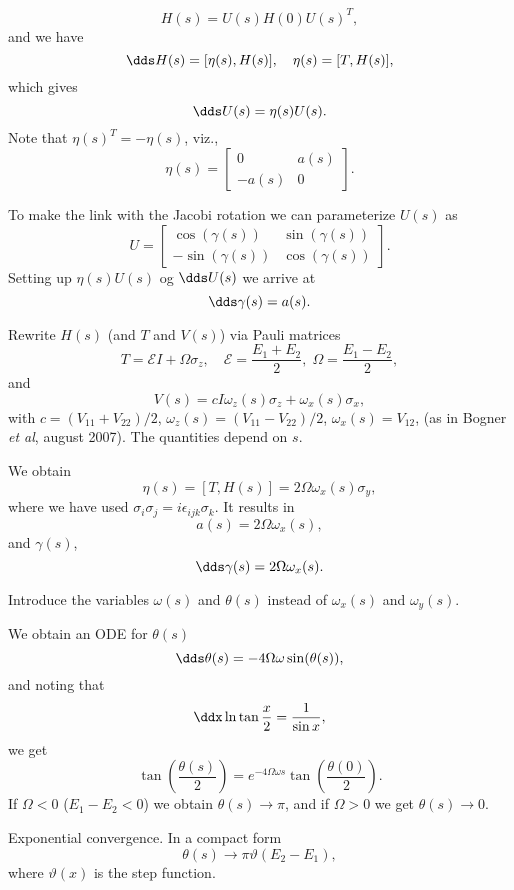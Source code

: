 \[ H(s) = U(s)H(0)U(s)^T, \]
and we have
\[ \dds H(s) = [\eta(s),H(s)],  \quad \eta(s) = [T,H(s)], \]
which gives
\[ \dds U(s) = \eta(s) U(s). \]
Note that $\eta(s)^T = -\eta(s)$, viz.,
\[ \eta(s) = \begin{bmatrix} 0 & a(s) \\ -a(s) & 0 \end{bmatrix}. \]

To make the link with the Jacobi rotation
we can parameterize $U(s)$ as
\[ U = \begin{bmatrix} \cos(\gamma(s)) & \sin(\gamma(s)) \\ -\sin(\gamma(s)) & \cos(\gamma(s)) \end{bmatrix}. \]
Setting up $\eta(s)U(s)$ og $\dds U(s)$ we arrive at 
\[ \dds \gamma(s) = a(s). \]

Rewrite $H(s)$ (and $T$ and $V(s)$)  via Pauli matrices
\[ T = \mathcal{E} I + \Omega \sigma_z, \quad \mathcal{E} = \frac{E_1
  + E_2}{2}, \; \Omega = \frac{E_1-E_2}{2}, \]
and
\[ V(s) = c I \omega_z(s)\sigma_z + \omega_x(s)\sigma_x, \]
with $c = (V_{11}+V_{22})/2$, $\omega_z(s) = (V_{11}-V_{22})/2$,
$\omega_x(s) = V_12$, (as in Bogner {\em et al}, august 2007). The quantities depend on
$s$. 

We obtain
\[ \eta(s) = [T, H(s)] = 2\Omega\omega_x(s)\sigma_y, \]
where we have used $\sigma_i\sigma_j = i\epsilon_{ijk}\sigma_k$.
It results in
\[ a(s) = 2\Omega \omega_x(s), \]
and $\gamma(s)$,
\begin{equation} \dds \gamma(s) = 2\Omega\omega_x(s). \label{eq:3}\end{equation}

Introduce the  variables $\omega(s)$ and $\theta(s)$ instead of
$\omega_x(s)$ and $\omega_y(s)$. 

We obtain an ODE for $\theta(s)$ 
\begin{equation} \dds \theta(s) = -4\Omega\omega \sin(\theta(s)), \label{eq:4}\end{equation}
and noting that
\[ \ddx \ln \tan \frac{x}{2} = \frac{1}{\sin x}, \]
we get
\[ \tan\left(\frac{\theta(s)}{2}\right) = e^{-4\Omega\omega s} \tan\left(
  \frac{\theta(0)}{2}\right). \]
If $\Omega<0$ ($E_1-E_2<0$) we obtain  $\theta(s)\rightarrow \pi$, and if 
$\Omega>0$ we get  $\theta(s)\rightarrow 0$. 

Exponential convergence. In a compact form
\begin{equation} \theta(s) \rightarrow \pi \vartheta(E_2 - E_1),
  \label{eq:5} \end{equation}
where $\vartheta(x)$ is the  step function.

